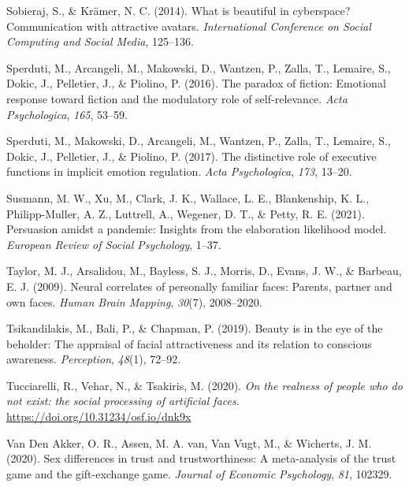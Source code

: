 \documentclass[
  man,floatsintext]{apa6}
\newlength{\cslhangindent}
\newlength{\cslentryspacingunit} %
\newenvironment{CSLReferences}[2] %
 {%
  \setlength{\parindent}{0pt}
  \ifodd #1
  \let\oldpar\par
  \def\par{\hangindent=\cslhangindent\oldpar}
  \fi
  \setlength{\parskip}{#2\cslentryspacingunit}
 }%
 {}
\begin{document}
\begin{CSLReferences}{1}{0}
\leavevmode{}%
Sobieraj, S., \& Krämer, N. C. (2014). What is beautiful in cyberspace? Communication with attractive avatars. \emph{International Conference on Social Computing and Social Media}, 125--136.

\leavevmode{}%
Sperduti, M., Arcangeli, M., Makowski, D., Wantzen, P., Zalla, T., Lemaire, S., Dokic, J., Pelletier, J., \& Piolino, P. (2016). The paradox of fiction: Emotional response toward fiction and the modulatory role of self-relevance. \emph{Acta Psychologica}, \emph{165}, 53--59.

\leavevmode{}%
Sperduti, M., Makowski, D., Arcangeli, M., Wantzen, P., Zalla, T., Lemaire, S., Dokic, J., Pelletier, J., \& Piolino, P. (2017). The distinctive role of executive functions in implicit emotion regulation. \emph{Acta Psychologica}, \emph{173}, 13--20.

\leavevmode{}%
Susmann, M. W., Xu, M., Clark, J. K., Wallace, L. E., Blankenship, K. L., Philipp-Muller, A. Z., Luttrell, A., Wegener, D. T., \& Petty, R. E. (2021). Persuasion amidst a pandemic: Insights from the elaboration likelihood model. \emph{European Review of Social Psychology}, 1--37.

\leavevmode{}%
Taylor, M. J., Arsalidou, M., Bayless, S. J., Morris, D., Evans, J. W., \& Barbeau, E. J. (2009). Neural correlates of personally familiar faces: Parents, partner and own faces. \emph{Human Brain Mapping}, \emph{30}(7), 2008--2020.

\leavevmode{}%
Tsikandilakis, M., Bali, P., \& Chapman, P. (2019). Beauty is in the eye of the beholder: The appraisal of facial attractiveness and its relation to conscious awareness. \emph{Perception}, \emph{48}(1), 72--92.

\leavevmode{}%
Tucciarelli, R., Vehar, N., \& Tsakiris, M. (2020). \emph{On the realness of people who do not exist: the social processing of artificial faces}. \url{https://doi.org/10.31234/osf.io/dnk9x}

\leavevmode{}%
Van Den Akker, O. R., Assen, M. A. van, Van Vugt, M., \& Wicherts, J. M. (2020). Sex differences in trust and trustworthiness: A meta-analysis of the trust game and the gift-exchange game. \emph{Journal of Economic Psychology}, \emph{81}, 102329.


\end{CSLReferences}
\end{document}
